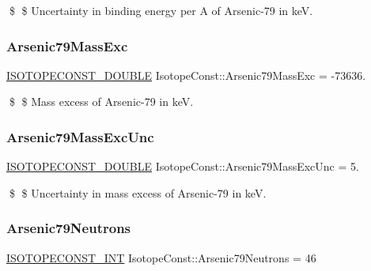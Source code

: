 \$ \$ Uncertainty in binding energy per A of Arsenic-\/79 in keV. \mbox{\label{group___isotope_const-_arsenic-_as79_gaad8bd63570267849cf575b246e0caaa9}} 
\subsubsection{\texorpdfstring{Arsenic79\+Mass\+Exc}{Arsenic79MassExc}}
{\footnotesize\ttfamily \mbox{\hyperlink{group___isotope_const-_macros_ga8f45a7272ce02c0b4c65c44636ed719a}{I\+S\+O\+T\+O\+P\+E\+C\+O\+N\+S\+T\+\_\+\+D\+O\+U\+B\+LE}} Isotope\+Const\+::\+Arsenic79\+Mass\+Exc = -\/73636.}

\$ \$ Mass excess of Arsenic-\/79 in keV. \mbox{\label{group___isotope_const-_arsenic-_as79_ga3cc63ef8869b0c4a4cd31d1a6c4af8bd}} 
\subsubsection{\texorpdfstring{Arsenic79\+Mass\+Exc\+Unc}{Arsenic79MassExcUnc}}
{\footnotesize\ttfamily \mbox{\hyperlink{group___isotope_const-_macros_ga8f45a7272ce02c0b4c65c44636ed719a}{I\+S\+O\+T\+O\+P\+E\+C\+O\+N\+S\+T\+\_\+\+D\+O\+U\+B\+LE}} Isotope\+Const\+::\+Arsenic79\+Mass\+Exc\+Unc = 5.}

\$ \$ Uncertainty in mass excess of Arsenic-\/79 in keV. \mbox{\label{group___isotope_const-_arsenic-_as79_gad48d520cbd4f66af27463c133c6e472c}} 
\subsubsection{\texorpdfstring{Arsenic79\+Neutrons}{Arsenic79Neutrons}}
{\footnotesize\ttfamily \mbox{\hyperlink{group___isotope_const-_macros_ga5f18360b3e99483a35c32d789e62621c}{I\+S\+O\+T\+O\+P\+E\+C\+O\+N\+S\+T\+\_\+\+I\+NT}} Isotope\+Const\+::\+Arsenic79\+Neutrons = 46}

